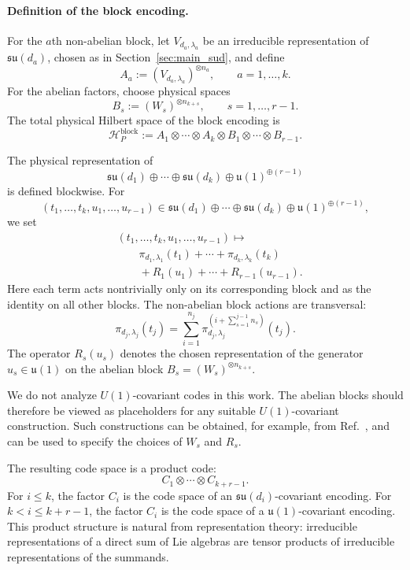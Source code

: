 \documentclass[10pt,twocolumn,superscriptaddress,aps,amsmath,amssymb,citeautoscript,floatfix,prx,longbibliography]{revtex4-2}
\newcounter{alg}
\theoremstyle{plain}
\theoremstyle{plain}
\theoremstyle{plain}
\theoremstyle{plain}
\theoremstyle{plain}
\theoremstyle{plain}
\begin{document}
\paragraph{Definition of the block encoding.}

For the $a$th non-abelian block, let $V_{d_a,\lambda_a}$ be an irreducible representation of $\mathfrak{su}(d_a)$, chosen as in Section~\ref{sec:main_sud}, and define
$$
A_a
:=
(V_{d_a,\lambda_a})^{\otimes n_a},
\qquad
a=1,\ldots,k .
$$
For the abelian factors, choose physical spaces
$$
B_s
:=
(W_s)^{\otimes n_{k+s}},
\qquad
s=1,\ldots,r-1 .
$$
The total physical Hilbert space of the block encoding is
$$
\mathcal H_P^{\mathrm{block}}
:=
A_1
\otimes
\cdots
\otimes
A_k
\otimes
B_1
\otimes
\cdots
\otimes
B_{r-1}.
$$

The physical representation of
$$
\mathfrak{su}(d_1)
\oplus
\cdots
\oplus
\mathfrak{su}(d_k)
\oplus
\mathfrak{u}(1)^{\oplus(r-1)}
$$
is defined blockwise. For
$$
(t_1,\ldots,t_k,u_1,\ldots,u_{r-1})
\in
\mathfrak{su}(d_1)
\oplus
\cdots
\oplus
\mathfrak{su}(d_k)
\oplus
\mathfrak{u}(1)^{\oplus(r-1)},
$$
we set
\begin{equation}\label{eq:block_enc_def}
\begin{aligned}
&(t_1,\ldots,t_k,u_1,\ldots,u_{r-1})
\longmapsto
\\
&\qquad
\pi_{d_1,\lambda_1}(t_1)
+
\cdots
+
\pi_{d_k,\lambda_k}(t_k)\\
&\qquad+
R_1(u_1)
+
\cdots
+
R_{r-1}(u_{r-1}) .
\end{aligned}
\end{equation}
Here each term acts nontrivially only on its corresponding block and as the identity on all other blocks. The non-abelian block actions are transversal:
\begin{equation}
\pi_{d_j,\lambda_j}(t_j)
=
\sum_{i=1}^{n_j}
\pi_{d_j,\lambda_j}^{(i+\sum_{s=1}^{j-1}n_s)}(t_j).
\end{equation}
The operator $R_s(u_s)$ denotes the chosen representation of the generator $u_s\in\mathfrak{u}(1)$ on the abelian block $B_s=(W_s)^{\otimes n_{k+s}}$.

We do not analyze $U(1)$-covariant codes in this work. The abelian blocks should therefore be viewed as placeholders for any suitable $U(1)$-covariant construction. Such constructions can be obtained, for example, from Ref.~\cite{Lin2025}, and can be used to specify the choices of $W_s$ and $R_s$.

The resulting code space is a product code:
\begin{equation}\label{eq:product_code}
C_1
\otimes
\cdots
\otimes
C_{k+r-1}.
\end{equation}
For $i\le k$, the factor $C_i$ is the code space of an $\mathfrak{su}(d_i)$-covariant encoding. For $k<i\le k+r-1$, the factor $C_i$ is the code space of a $\mathfrak{u}(1)$-covariant encoding. This product structure is natural from representation theory: irreducible representations of a direct sum of Lie algebras are tensor products of irreducible representations of the summands.
\end{document}
